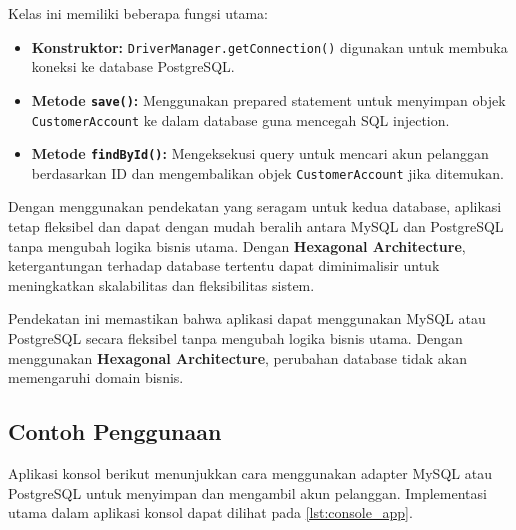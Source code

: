 \begin{enumerate}
	Kelas ini memiliki beberapa fungsi utama:
	\begin{itemize}
		\item \textbf{Konstruktor:} \texttt{DriverManager.getConnection()} digunakan untuk membuka koneksi ke database PostgreSQL.
		\item \textbf{Metode \texttt{save()}:} Menggunakan prepared statement untuk menyimpan objek \texttt{CustomerAccount} ke dalam database guna mencegah SQL injection.
		\item \textbf{Metode \texttt{findById()}:} Mengeksekusi query untuk mencari akun pelanggan berdasarkan ID dan mengembalikan objek \texttt{CustomerAccount} jika ditemukan.
	\end{itemize}
	
	Dengan menggunakan pendekatan yang seragam untuk kedua database, aplikasi tetap fleksibel dan dapat dengan mudah beralih antara MySQL dan PostgreSQL tanpa mengubah logika bisnis utama. Dengan \textbf{Hexagonal Architecture}, ketergantungan terhadap database tertentu dapat diminimalisir untuk meningkatkan skalabilitas dan fleksibilitas sistem.

	
	

	
\end{enumerate}

Pendekatan ini memastikan bahwa aplikasi dapat menggunakan MySQL atau PostgreSQL secara fleksibel tanpa mengubah logika bisnis utama. Dengan menggunakan \textbf{Hexagonal Architecture}, perubahan database tidak akan memengaruhi domain bisnis.



\subsection{Contoh Penggunaan}
Aplikasi konsol berikut menunjukkan cara menggunakan adapter MySQL atau PostgreSQL untuk menyimpan dan mengambil akun pelanggan. Implementasi utama dalam aplikasi konsol dapat dilihat pada \ref{lst:console_app}.

